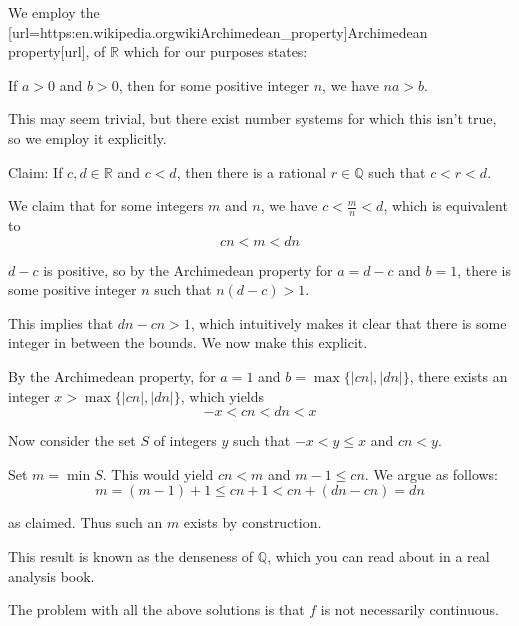 \begin{solution}
	We employ the [url=https:\/\/en.wikipedia.org\/wiki\/Archimedean_property]Archimedean property[\/url], of $\mathbb{R}$ which for our purposes states:

If $a > 0$ and $b>0$, then for some positive integer $n$, we have $na > b$.  

This may seem trivial, but there exist number systems for which this isn't true, so we employ it explicitly.

Claim:
If $c, d \in \mathbb{R}$ and $c<d$, then there is a rational $r \in \mathbb{Q}$ such that $c < r < d$.

We claim that for some integers $m$ and $n$, we have $c < \frac{m}{n} < d$, which is equivalent to 
\[
cn < m < dn
\]

$d-c$ is positive, so by the Archimedean property for $a = d-c$ and $b = 1$, there is some positive integer $n$ such that $n(d-c) > 1$.  

This implies that $dn - cn > 1$, which intuitively makes it clear that there is some integer in between the bounds.  We now make this explicit.

By the Archimedean property, for $a = 1$ and $b = \max\{|cn|, |dn|\}$, there exists an integer $x >\max\{|cn|, |dn|\}$, which yields
\[
-x < cn < dn < x
\]

Now consider the set $S$ of integers $y$ such that $-x < y \leq x$ and $cn < y$.

Set $m = \min S$.  This would yield $cn < m$ and $m-1 \leq cn$.  We argue as follows:
\[
m = (m-1) + 1 \leq cn + 1 < cn + (dn - cn) = dn
\]

as claimed.  Thus such an $m$ exists by construction.

This result is known as the denseness of $\mathbb{Q}$, which you can read about in a real analysis book.
\end{solution}



\begin{solution}
	The problem with all the above solutions is that $f$ is not necessarily continuous.
\end{solution}



